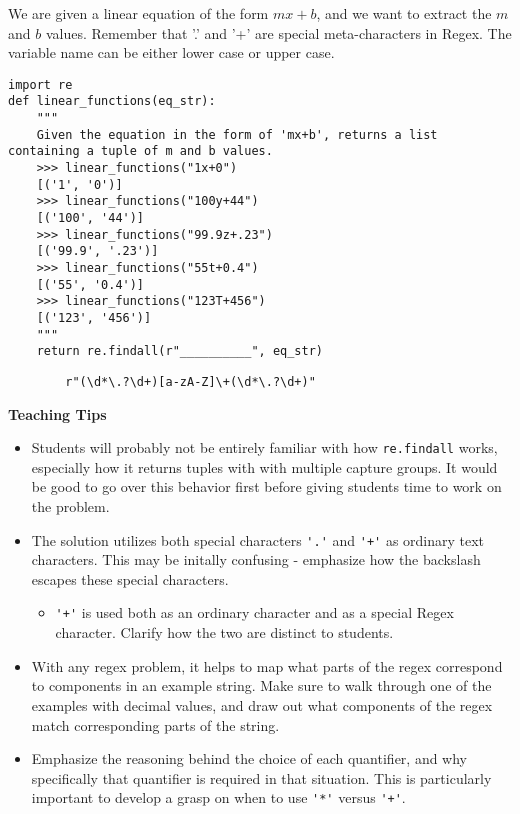 \begin{blocksection}
\question We are given a linear equation of the form $mx+b$, and we want to extract the $m$ and $b$ values. Remember that '.' and '+' are special meta-characters in Regex. The variable name can be either lower case or upper case.

\begin{lstlisting}
import re
def linear_functions(eq_str):
    """
    Given the equation in the form of 'mx+b', returns a list containing a tuple of m and b values.
    >>> linear_functions("1x+0")
    [('1', '0')]
    >>> linear_functions("100y+44")
    [('100', '44')]
    >>> linear_functions("99.9z+.23")
    [('99.9', '.23')]
    >>> linear_functions("55t+0.4")
    [('55', '0.4')]
    >>> linear_functions("123T+456")
    [('123', '456')]
    """
    return re.findall(r"__________", eq_str)
\end{lstlisting}

\begin{solution}[2in]
    \begin{lstlisting}
        r"(\d*\.?\d+)[a-zA-Z]\+(\d*\.?\d+)"
    \end{lstlisting}
\end{solution}
\end{blocksection}

\begin{guide}
\begin{blocksection}
\textbf{Teaching Tips}
    \begin{itemize}
        \item Students will probably not be entirely familiar with how \lstinline{re.findall} works, especially how it returns tuples with with multiple capture groups. It would be good to go over this behavior first before giving students time to work on the problem.
        \item The solution utilizes both special characters \lstinline$'.'$ and \lstinline$'+'$ as ordinary text characters. This may be initally confusing - emphasize how the backslash escapes these special characters.
        \begin{itemize}
            \item \lstinline$'+'$ is used both as an ordinary character and as a special Regex character. Clarify how the two are distinct to students.
        \end{itemize}
        \item With any regex problem, it helps to map what parts of the regex correspond to components in an example string. Make sure to walk through one of the examples with decimal values, and draw out what components of the regex match corresponding parts of the string.
        \item Emphasize the reasoning behind the choice of each quantifier, and why specifically that quantifier is required in that situation. This is particularly important to develop a grasp on when to use \lstinline$'*'$ versus \lstinline$'+'$.
    \end{itemize}
\end{blocksection}
\end{guide}

